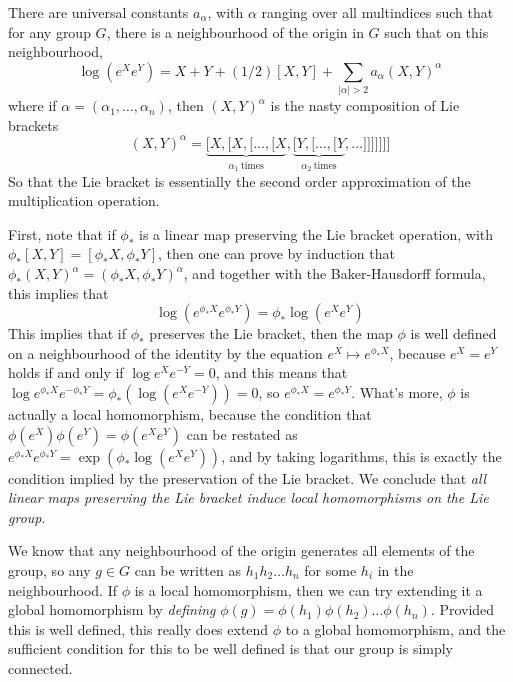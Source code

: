 \begin{fact}
    There are universal constants $a_\alpha$, with $\alpha$ ranging over all multindices such that for any group $G$, there is a neighbourhood of the origin in $G$ such that on this neighbourhood,
    \[ \log(e^X e^Y) = X + Y + (1/2) [X,Y] + \sum_{|\alpha| > 2} a_\alpha (X,Y)^\alpha \]
    where if $\alpha = (\alpha_1, \dots, \alpha_n)$, then $(X,Y)^\alpha$ is the nasty composition of Lie brackets
    \[ (X,Y)^\alpha = \underbrace{[X, [X, [\dots, [X}_{\alpha_1\ \text{times}}, \underbrace{[Y, [\dots, [Y}_{\alpha_2\ \text{times}}, \dots]]]]]]] \]
    So that the Lie bracket is essentially the second order approximation of the multiplication operation.
\end{fact}

First, note that if $\phi_*$ is a linear map preserving the Lie bracket operation, with $\phi_*[X,Y] = [\phi_*X, \phi_*Y]$, then one can prove by induction that $\phi_* (X,Y)^\alpha = (\phi_* X, \phi_* Y)^\alpha$, and together with the Baker-Hausdorff formula, this implies that
%
\[ \log(e^{\phi_* X} e^{\phi_* Y}) = \phi_* \log(e^X e^Y) \]
%
This implies that if $\phi_*$ preserves the Lie bracket, then the map $\phi$ is well defined on a neighbourhood of the identity by the equation $e^X \mapsto e^{\phi_* X}$, because $e^X = e^Y$ holds if and only if $\log e^X e^{-Y} = 0$, and this means that $\log e^{\phi_* X} e^{- \phi_* Y} = \phi_* ( \log(e^X e^{-Y})) = 0$, so $e^{\phi_* X} = e^{\phi_* Y}$. What's more, $\phi$ is actually a local homomorphism, because the condition that $\phi(e^X) \phi(e^Y) = \phi(e^X e^Y)$ can be restated as $e^{\phi_* X} e^{\phi_* Y} = \exp(\phi_* \log(e^X e^Y))$, and by taking logarithms, this is exactly the condition implied by the preservation of the Lie bracket. We conclude that {\it all linear maps preserving the Lie bracket induce local homomorphisms on the Lie group}.

We know that any neighbourhood of the origin generates all elements of the group, so any $g \in G$ can be written as $h_1 h_2 \dots h_n$ for some $h_i$ in the neighbourhood. If $\phi$ is a local homomorphism, then we can try extending it a global homomorphism by {\it defining} $\phi(g) = \phi(h_1) \phi(h_2) \dots \phi(h_n)$. Provided this is well defined, this really does extend $\phi$ to a global homomorphism, and the sufficient condition for this to be well defined is that our group is simply connected.

